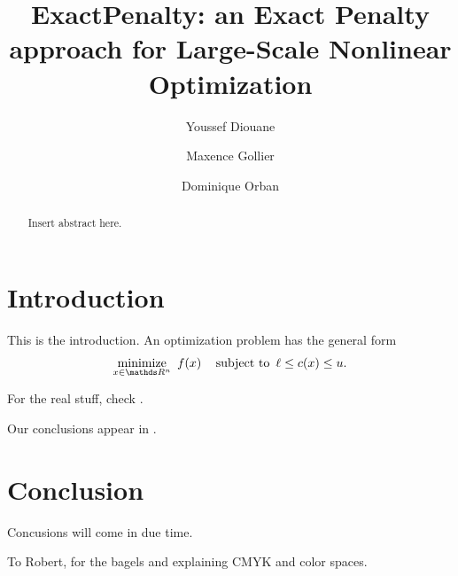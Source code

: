 \documentclass[manuscript, screen, review]{acmart} %
\begin{document}
\title{ExactPenalty: an Exact Penalty approach for Large-Scale Nonlinear Optimization}

\author{Youssef Diouane}

\author{Maxence Gollier}

\author{Dominique Orban}


\begin{abstract}
  Insert abstract here. 
\end{abstract}



\linenumbers
\makeatletter
\let\ps@firstpagestyle\ps@firstpage
\makeatother
\pagestyle{geradheadings}
\maketitle

\hypertarget{contents}{}
\tableofcontents
\listoftodos\relax

\section{Introduction}

This is the introduction. An optimization problem has the general form
\begin{equation}
  \label{eq:opt-problem}
  \minimize{x \in \R^n} \ f(x) \quad \st \ \ell \leq c(x) \leq u.
\end{equation}

For the real stuff, check \citet{wright-orban-2002}.

Our conclusions appear in .

\section{Conclusion}%
\label{sec:conclusion}

Concusions will come in due time.

\begin{acks}
To Robert, for the bagels and explaining CMYK and color spaces.
\end{acks}



\end{document}
